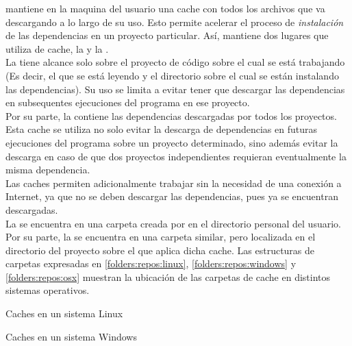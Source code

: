 \fronttier mantiene en la maquina del usuario una cache con todos los archivos 
que va descargando a lo largo de su uso. Esto permite acelerar el proceso de 
\emph{instalación} de las dependencias en un proyecto  particular. Así, 
\fronttier mantiene dos lugares que utiliza de cache, la \cachel y la \cacheg.\\
La \cachel tiene alcance solo sobre el proyecto de código sobre el cual se está 
trabajando (Es decir, el \conffile que se está leyendo y el directorio sobre el 
cual se están instalando las dependencias). Su uso se limita a evitar tener que 
descargar las dependencias en subsequentes ejecuciones del programa en ese 
proyecto.\\
Por su parte, la \cacheg contiene las dependencias descargadas por todos los 
proyectos. Esta cache se utiliza no solo evitar la descarga de dependencias en 
futuras ejecuciones del programa sobre un proyecto determinado, sino además 
evitar la descarga en caso de que dos proyectos independientes requieran 
eventualmente la misma dependencia.\\
Las caches permiten adicionalmente trabajar sin la necesidad de
una conexión a Internet, ya que no se deben descargar las dependencias, pues ya 
se encuentran descargadas.\\
La \cacheg se encuentra en una carpeta creada por \fronttier en el directorio 
personal del usuario. Por su parte, la \cachel se encuentra en una carpeta 
similar, pero localizada en el directorio del proyecto sobre el que aplica 
dicha cache. Las estructuras de carpetas expresadas en 
\ref{folders:repos:linux}, \ref{folders:repos:windows} y
\ref{folders:repos:osx} muestran la ubicación de las carpetas de cache en 
distintos sistemas operativos.

\begin{folders}[h]
	\caption{Caches en un sistema Linux}
	\label{folders:repos:linux}
\end{folders}

\begin{folders}[h]
	\caption{Caches en un sistema Windows}
	\label{folders:repos:windows}
\end{folders}

